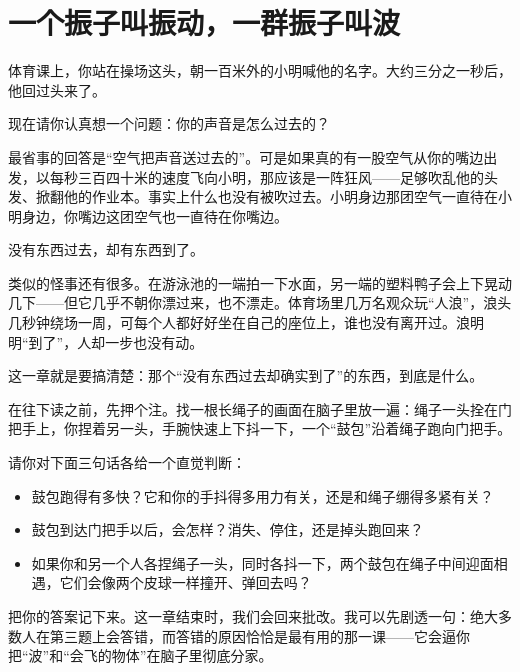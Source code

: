 \chapter{一个振子叫振动，一群振子叫波}


\begin{mainline}
体育课上，你站在操场这头，朝一百米外的小明喊他的名字。大约三分之一秒后，他回过头来了。

现在请你认真想一个问题：你的声音是怎么过去的？

最省事的回答是“空气把声音送过去的”。可是如果真的有一股空气从你的嘴边出发，以每秒三百四十米的速度飞向小明，那应该是一阵狂风——足够吹乱他的头发、掀翻他的作业本。事实上什么也没有被吹过去。小明身边那团空气一直待在小明身边，你嘴边这团空气也一直待在你嘴边。

没有东西过去，却有东西到了。

类似的怪事还有很多。在游泳池的一端拍一下水面，另一端的塑料鸭子会上下晃动几下——但它几乎不朝你漂过来，也不漂走。体育场里几万名观众玩“人浪”，浪头几秒钟绕场一周，可每个人都好好坐在自己的座位上，谁也没有离开过。浪明明“到了”，人却一步也没有动。

这一章就是要搞清楚：那个“没有东西过去却确实到了”的东西，到底是什么。
\end{mainline}


\begin{mainline}
在往下读之前，先押个注。找一根长绳子的画面在脑子里放一遍：绳子一头拴在门把手上，你捏着另一头，手腕快速上下抖一下，一个“鼓包”沿着绳子跑向门把手。

请你对下面三句话各给一个直觉判断：

\begin{itemize}
  \item 鼓包跑得有多快？它和你的手抖得多用力有关，还是和绳子绷得多紧有关？
  \item 鼓包到达门把手以后，会怎样？消失、停住，还是掉头跑回来？
  \item 如果你和另一个人各捏绳子一头，同时各抖一下，两个鼓包在绳子中间迎面相遇，它们会像两个皮球一样撞开、弹回去吗？
\end{itemize}

把你的答案记下来。这一章结束时，我们会回来批改。我可以先剧透一句：绝大多数人在第三题上会答错，而答错的原因恰恰是最有用的那一课——它会逼你把“波”和“会飞的物体”在脑子里彻底分家。
\end{mainline}


